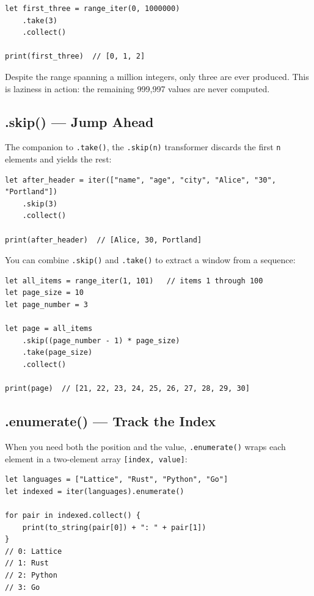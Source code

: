 \begin{lstlisting}[language=Lattice, caption={Taking the first few elements}]
let first_three = range_iter(0, 1000000)
    .take(3)
    .collect()

print(first_three)  // [0, 1, 2]
\end{lstlisting}

Despite the range spanning a million integers, only three are ever produced.
This is laziness in action: the remaining 999{,}997 values are never computed.

\subsection{.skip() --- Jump Ahead}\label{subsec:iter-skip}

The companion to \lstinline|.take()|, the \lstinline|.skip(n)| transformer discards the first \lstinline|n| elements and yields the rest:

\begin{lstlisting}[language=Lattice, caption={Skipping elements}]
let after_header = iter(["name", "age", "city", "Alice", "30", "Portland"])
    .skip(3)
    .collect()

print(after_header)  // [Alice, 30, Portland]
\end{lstlisting}

You can combine \lstinline|.skip()| and \lstinline|.take()| to extract a window from a sequence:

\begin{lstlisting}[language=Lattice, caption={Pagination with skip and take}]
let all_items = range_iter(1, 101)   // items 1 through 100
let page_size = 10
let page_number = 3

let page = all_items
    .skip((page_number - 1) * page_size)
    .take(page_size)
    .collect()

print(page)  // [21, 22, 23, 24, 25, 26, 27, 28, 29, 30]
\end{lstlisting}

\subsection{.enumerate() --- Track the Index}\label{subsec:iter-enumerate}

When you need both the position and the value, \lstinline|.enumerate()| wraps each element in a two-element array \lstinline|[index, value]|:

\begin{lstlisting}[language=Lattice, caption={Enumerating an iterator}]
let languages = ["Lattice", "Rust", "Python", "Go"]
let indexed = iter(languages).enumerate()

for pair in indexed.collect() {
    print(to_string(pair[0]) + ": " + pair[1])
}
// 0: Lattice
// 1: Rust
// 2: Python
// 3: Go
\end{lstlisting}

